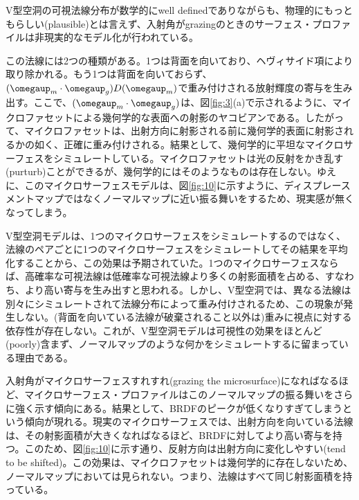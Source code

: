 \documentclass[a4j,xelatex,ja=standard]{bxjsarticle}
\begin{document}
V型空洞の可視法線分布が数学的にwell definedでありながらも、物理的にもっともらしい(plausible)とは言えず、入射角がgrazingのときのサーフェス・プロファイルは非現実的なモデル化が行われている。

この法線には2つの種類がある。1つは背面を向いており、ヘヴィサイド項により取り除かれる。もう1つは背面を向いておらず、$(\boldsymbol{\omegaup}_m \cdot \boldsymbol{\omegaup}_g) D(\boldsymbol{\omegaup}_m)$で重み付けされる放射輝度の寄与を生み出す。ここで、$(\boldsymbol{\omegaup}_m \cdot \boldsymbol{\omegaup}_g)$は、図\ref{fig:3}(a)で示されるように、マイクロファセットによる幾何学的な表面への射影のヤコビアンである。したがって、マイクロファセットは、出射方向に射影される前に幾何学的表面に射影されるかの如く、正確に重み付けされる。結果として、幾何学的に平坦なマイクロサーフェスをシミュレートしている。マイクロファセットは光の反射をかき乱す(purturb)ことができるが、幾何学的にはそのようなものは存在しない。ゆえに、このマイクロサーフェスモデルは、図\ref{fig:10}に示すように、ディスプレースメントマップではなくノーマルマップに近い振る舞いをするため、現実感が無くなってしまう。

V型空洞モデルは、1つのマイクロサーフェスをシミュレートするのではなく、法線のペアごとに1つのマイクロサーフェスをシミュレートしてその結果を平均化することから、この効果は予期されていた。1つのマイクロサーフェスならば、高確率な可視法線は低確率な可視法線より多くの射影面積を占める、すなわち、より高い寄与を生み出すと思われる。しかし、V型空洞では、異なる法線は別々にシミュレートされて法線分布によって重み付けされるため、この現象が発生しない。(背面を向いている法線が破棄されること以外は)重みに視点に対する依存性が存在しない。これが、V型空洞モデルは可視性の効果をほとんど(poorly)含まず、ノーマルマップのような何かをシミュレートするに留まっている理由である。

入射角がマイクロサーフェスすれすれ(grazing the microsurface)になればなるほど、マイクロサーフェス・プロファイルはこのノーマルマップの振る舞いをさらに強く示す傾向にある。結果として、BRDFのピークが低くなりすぎてしまうという傾向が現れる。現実のマイクロサーフェスでは、出射方向を向いている法線は、その射影面積が大きくなればなるほど、BRDFに対してより高い寄与を持つ。このため、図\ref{fig:10}に示す通り、反射方向は出射方向に変化しやすい(tend to be shifted)。この効果は、マイクロファセットは幾何学的に存在しないため、ノーマルマップにおいては見られない。つまり、法線はすべて同じ射影面積を持っている。
\end{document}
